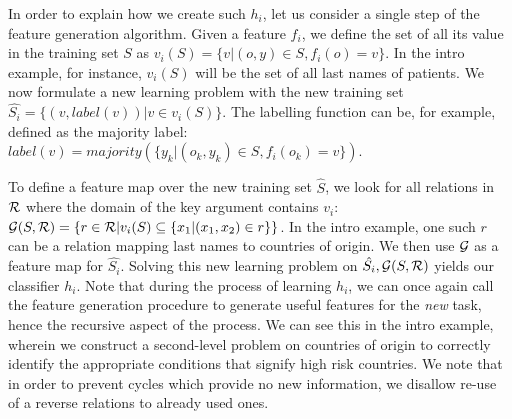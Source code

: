 \documentclass{article}
\theoremstyle{definition}
\begin{document}
In order to explain how we create such $h_{i}$, let us consider a single step of the feature generation algorithm.
Given a feature $f_{i}$, we define the set of all its value in the training set $S$ as $v_i(S) = \{v | (o,y) \in S, f_{i}(o)=v\}$. In the intro example, for instance, $v_i(S)$ will be the set of all last names of patients.
We now formulate a new learning problem with the new training set
$\hat{S_i} = \{ (v, label(v)) | v \in v_i(S) \}$.
The labelling function can be, for example, defined as
the majority label: $label(v)=majority(\{y_k| \left(o_k,y_k \right) \in S, f_{i}(o_k)=v\})$.

To define a feature map over the new training set $\hat{S}$, we look for all relations in $\cal R$ where the domain of the key argument contains $v_i$:
${\cal G}(S,{\cal R}) = \left\{ r \in {\cal R} | v_i(S) \subseteq \{x_1 | (x_1,x_2) \in r\}\right\}$. In the intro example, one such $r$ can be a relation mapping last names to countries of origin. We then use ${\cal G}$ as a feature map for $\hat{S_i}$.
Solving this new learning problem on $\hat{S_i}, {\cal G}(S,{\cal R})$ yields our classifier $h_{i}$.
Note that during the process of learning $h_{i}$, we can once again call the feature generation procedure to generate useful features for the \emph{new} task, hence the recursive aspect of the process. We can see this in the intro example, wherein we construct a second-level problem on countries of origin to correctly identify the appropriate conditions that signify high risk countries.
We note that in order to prevent cycles which provide no new information, we disallow re-use of a reverse relations to already used ones.
\end{document}
